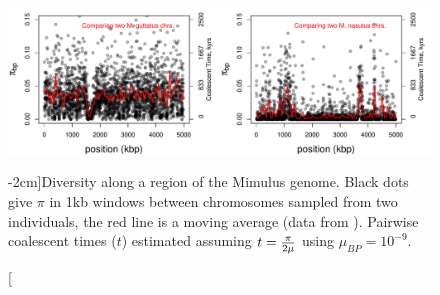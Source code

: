 \begin{figure}
\begin{center}
  \includegraphics[width = \textwidth]{figures/Genetic_drift/Demography/Mimulus_coalescent_times.pdf}
\end{center}
\caption[][-2cm]{Diversity along a region of the Mimulus genome. Black dots give $\pi$ in 1kb windows between chromosomes sampled from two individuals, the red line is a
  moving average (data from  \citeauthor{brandvain:14}). Pairwise coalescent times ($t$) estimated assuming $t= \nicefrac{\pi}{2 \mu} $ using $\mu_{BP}=10^{-9}$.  } \label{fig:Mimulus_bottleneck}
\end{figure}

